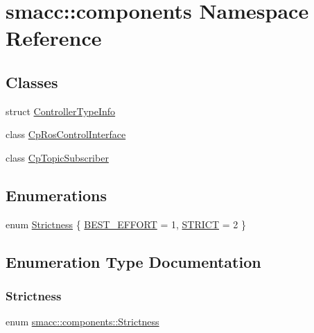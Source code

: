 \hypertarget{namespacesmacc_1_1components}{}\section{smacc\+:\+:components Namespace Reference}
\label{namespacesmacc_1_1components}
\subsection*{Classes}
\begin{DoxyCompactItemize}
\item 
struct \hyperlink{structsmacc_1_1components_1_1ControllerTypeInfo}{Controller\+Type\+Info}
\item 
class \hyperlink{classsmacc_1_1components_1_1CpRosControlInterface}{Cp\+Ros\+Control\+Interface}
\item 
class \hyperlink{classsmacc_1_1components_1_1CpTopicSubscriber}{Cp\+Topic\+Subscriber}
\end{DoxyCompactItemize}
\subsection*{Enumerations}
\begin{DoxyCompactItemize}
\item 
enum \hyperlink{namespacesmacc_1_1components_a18117d6a71feb2471fb4e07f47674e4c}{Strictness} \{ \hyperlink{namespacesmacc_1_1components_a18117d6a71feb2471fb4e07f47674e4cac068971243fbd65b8e03256ec6cc3ca7}{B\+E\+S\+T\+\_\+\+E\+F\+F\+O\+RT} = 1, 
\hyperlink{namespacesmacc_1_1components_a18117d6a71feb2471fb4e07f47674e4ca659b52150977b11ffc0fa1d7f1f30a01}{S\+T\+R\+I\+CT} = 2
 \}
\end{DoxyCompactItemize}


\subsection{Enumeration Type Documentation}
\mbox{\label{namespacesmacc_1_1components_a18117d6a71feb2471fb4e07f47674e4c}} 
\subsubsection{\texorpdfstring{Strictness}{Strictness}}
{\footnotesize\ttfamily enum \hyperlink{namespacesmacc_1_1components_a18117d6a71feb2471fb4e07f47674e4c}{smacc\+::components\+::\+Strictness}}

